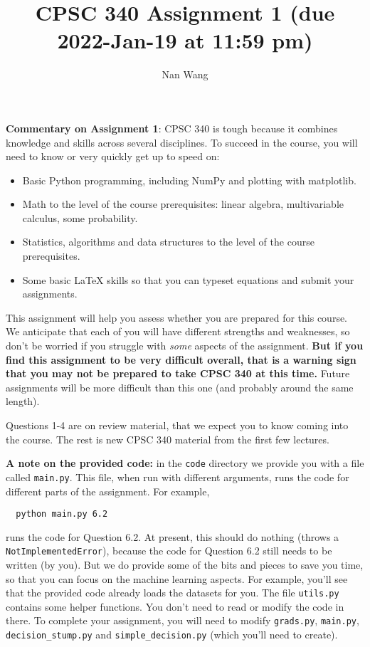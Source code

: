 \documentclass{article}
\author{Nan Wang}
\begin{document}
  \title{CPSC 340 Assignment 1 (due 2022-Jan-19 at 11:59 pm)}

  \date{}
  \maketitle



  \textbf{Commentary on Assignment 1}: CPSC 340 is tough because it combines knowledge and skills across several disciplines. To succeed
  in the course, you will need to know or very quickly get up to speed on:
  \begin{itemize}
  \item Basic Python programming, including NumPy and plotting with matplotlib.
  \item Math to the level of the course prerequisites: linear algebra, multivariable calculus, some probability.
  \item Statistics, algorithms and data structures to the level of the course prerequisites.
  \item Some basic LaTeX skills so that you can typeset equations and submit your assignments.
  \end{itemize}

  This assignment will help you assess whether you are prepared for this course. We anticipate that each
  of you will have different strengths and weaknesses, so don't be worried if you struggle with \emph{some} aspects
  of the assignment. \textbf{But if you find this assignment
  to be very difficult overall, that is a warning sign that you may not be prepared to take CPSC 340
  at this time.} Future assignments will be more difficult than this one (and probably around the same length).

  Questions 1-4 are on review material, that we expect you to know coming into the course. The rest is new CPSC 340 material from the first few lectures.

  \textbf{A note on the provided code:} in the \texttt{code} directory we provide you with a file called
  \texttt{main.py}. This file, when run with different arguments, runs the code for different
  parts of the assignment. For example,
  \begin{verbatim}
  python main.py 6.2
  \end{verbatim}
  runs the code for Question 6.2. At present, this should do nothing (throws a \texttt{NotImplementedError}), because the code
  for Question 6.2 still needs to be written (by you). But we do provide some of the bits
  and pieces to save you time, so that you can focus on the machine learning aspects.
  For example, you'll see that the provided code already loads the datasets for you.
  The file \texttt{utils.py} contains some helper functions.
  You don't need to read or modify the code in there.
  To complete your assignment, you will need to modify \texttt{grads.py}, \texttt{main.py}, \texttt{decision\string_stump.py} and \texttt{simple\string_decision.py} (which you'll need to create).
\end{document}
